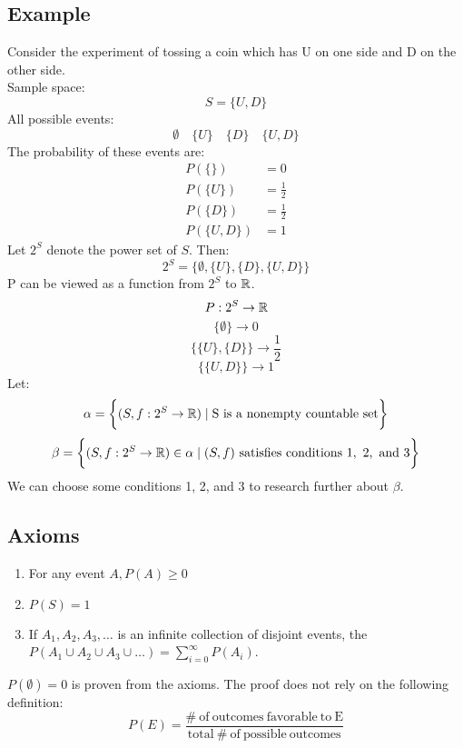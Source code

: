 \documentclass[letterpaper, 12pt]{math}
\begin{document}
\subsection*{Example}
Consider the experiment of tossing a coin which has U on one side and D on the
other side. \\
Sample space:
\[ S = \bigg\{ U, D \bigg\} \]
All possible events:
\[ \emptyset \quad \bigg\{ U \bigg\} \quad \bigg\{ D \bigg\} \quad
   \bigg\{ U, D \bigg\} \]
The probability of these events are:
\begin{align*}
  P(\{ \}) &= 0 \\
  P(\{ U \}) &= \frac{1}{2} \\
  P(\{ D \}) &= \frac{1}{2} \\
  P(\{ U, D \}) &= 1
\end{align*}
Let \( 2^{S} \) denote the power set of \( S \). Then:
\[ 2^{S} = \bigg\{ \emptyset, \{ U \}, \{ D \}, \{ U, D \} \bigg\} \]
P can be viewed as a function from \( 2^{S} \) to \( \mathbb{R} \).
\[ P:2^{S} \to \mathbb{R} \]
\[ \bigg\{ \emptyset \bigg\} \to 0 \]
\[ \bigg\{ \{ U \}, \{ D \} \bigg\} \to \frac{1}{2} \]
\[ \bigg\{ \{ U, D \} \bigg\} \to 1 \]
Let:
\[ \alpha = \bigg\{ (S, f:2^{S} \to \mathbb{R}) \mid \mathrm{S\ is\ a\ nonempty\
   countable\ set} \bigg\} \]
\[ \beta = \bigg\{(S, f:2^{S} \to \mathbb{R}) \in \alpha \mid (S, f)
   \mathrm{\ satisfies\ conditions\ 1,\ 2,\ and\ 3} \bigg\} \]
We can choose some conditions 1, 2, and 3 to research further about
\( \beta \).

\subsection*{Axioms}
\begin{enumerate}
  \item For any event \( A, P(A) \geq 0 \)
  \item \( P(S) = 1 \)
  \item If \( A_{1}, A_{2}, A_{3}, \dots \) is an infinite collection of
    disjoint events, the \( P(A_{1} \cup A_{2} \cup A_{3} \cup \dots) =
    \sum_{i=0}^{\infty}P(A_{i}) \).
\end{enumerate}
\( P(\emptyset) = 0 \) is proven from the axioms. The proof does not rely on
the following definition:
\[ P(E) = \frac{\mathrm{\#\ of\ outcomes\ favorable\ to\ E}}
   {\mathrm{total\ \#\ of\ possible\ outcomes}} \]
\end{document}
